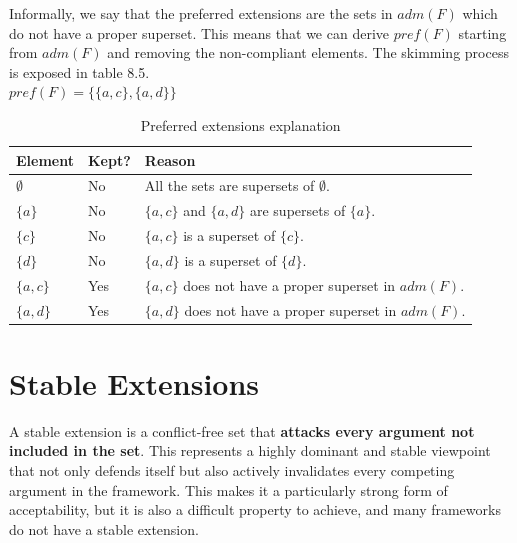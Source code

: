 \documentclass{scrbook}
\begin{document}
Informally, we say that the preferred extensions are the sets in $adm(F)$ which do not have a proper superset. This means that we can derive $pref(F)$ starting from $adm(F)$ and removing the non-compliant elements. The skimming process is exposed in table 8.5.\\

$pref(F) = \{\{a,c\},\{a,d\}\}$

\begin{table}
    \begin{tabularx}{\linewidth}{|p{5em}|p{4em}|X|} \hline
         \textbf{Element} & \textbf{Kept?} & \textbf{Reason} \\ \hline

        $\emptyset$ & No &
        All the sets are supersets of $\emptyset$.\\ \hline

        $\{a\}$ & No &
        $\{a,c\}$ and $\{a,d\}$ are supersets of $\{a\}$.\\ \hline

        $\{c\}$ & No &
        $\{a,c\}$ is a superset of $\{c\}$.\\ \hline

        $\{d\}$ & No &
        $\{a,d\}$ is a superset of $\{d\}$.\\ \hline

        $\{a,c\}$ & Yes &
        $\{a,c\}$ does not have a proper superset in $adm(F)$.\\ \hline

        $\{a,d\}$ & Yes &
        $\{a,d\}$ does not have a proper superset in $adm(F)$.\\ \hline
    \end{tabularx}
    \caption{Preferred extensions explanation}
\end{table}

\section{Stable Extensions}

A stable extension is a conflict-free set that \textbf{attacks every argument not included in the set}. This represents a highly dominant and stable viewpoint that not only defends itself but also actively invalidates every competing argument in the framework. This makes it a particularly strong form of acceptability, but it is also a difficult property to achieve, and many frameworks do not have a stable extension. \\
\end{document}
